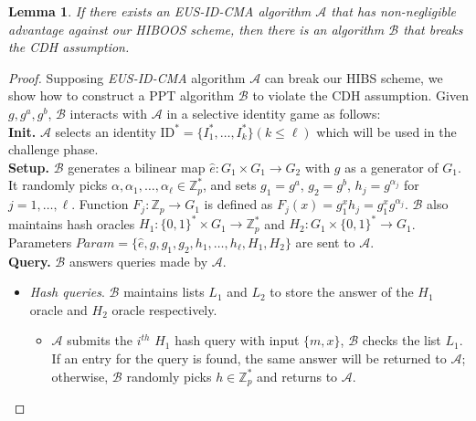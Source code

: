 \documentclass[times]{secauth}
\newtheorem{lemma}[theorem]{Lemma}
\theoremstyle{definition}
\theoremstyle{remark}
\begin{document}
\begin{lemma} \label{lemma-eus-hiboos}
If there exists an EUS-ID-CMA algorithm $\mathcal{A}$ that has non-negligible advantage against our HIBOOS scheme, 
then there is an algorithm $\mathcal{B}$ that breaks the CDH assumption.
\end{lemma}
\begin{proof}
Supposing \emph{EUS-ID-CMA} algorithm $\mathcal{A}$ can break our HIBS scheme, we show how to construct a PPT algorithm $\mathcal{B}$ to violate the CDH assumption. 
Given $g, g^a, g^b$, $\mathcal{B}$ interacts with $\mathcal{A}$ in a selective identity game as follows:
\vspace{0.2cm}
\\
\textbf{Init.} 
$\mathcal{A}$ selects an identity $\mathrm{ID}^* = \{I^*_1, \ldots, I^*_k\} (k \leqslant \ell)$ which will be used in the challenge phase.  
\vspace{0.2cm}
\\
\textbf{Setup.}
$\mathcal{B}$ generates a bilinear map $\hat{e}: G_1 \times G_1 \rightarrow G_2$ with $g$ as a generator of $G_1$.
It randomly picks $\alpha, \alpha_1, \ldots, \alpha_\ell \in \mathbb{Z}^*_p$, and sets $g_1 = g^a$, $g_2 = g^b$, $h_j =g^{\alpha_j}$ for $j = 1, \ldots, \ell$.
Function $F_j : \mathbb{Z}_p \rightarrow G_1$ is defined as $F_j(x)=g_1^xh_j =g_1^{x}g^{\alpha_j}$.
$\mathcal{B}$ also maintains hash oracles $H_1: \{0, 1\}^* \times G_1 \rightarrow \mathbb{Z}_p^*$ and $H_2: G_1 \times \{0, 1\}^* \rightarrow G_1$.
Parameters $Param = \{\hat{e}, g, g_1,  g_2, h_1, \ldots, h_\ell, H_1, H_2\}$ are sent to $\mathcal{A}$.
\vspace{0.2cm}
\\
\textbf{Query.}
$\mathcal{B}$ answers queries made by $\mathcal{A}$.
\begin{itemize}
	\item \emph{Hash queries}. 
	$\mathcal{B}$ maintains lists $L_1$ and $L_2$ to store the answer of the $H_1$ 		oracle and $H_2$ oracle respectively.
	\begin{itemize}
		\item $\mathcal{A}$ submits the $i^{th}$ $H_1$ hash query with input $\{m, x\}$, $\mathcal{B}$ checks the list $L_1$.
		If an entry for the query is found, the same answer will be returned to $\mathcal{A}$; otherwise, $\mathcal{B}$ randomly picks $h \in \mathbb{Z}_p^*$ and returns to $\mathcal{A}$.

\end{itemize}
\end{itemize}
\end{proof}
\end{document}
